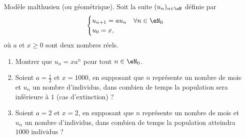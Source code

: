 


\begin{exercice}\label{exoTD3-0002}

	Modèle malthusien (ou géométrique). Soit la suite $(u_n)_{n\in\eN}$ définie par
	\begin{equation}
		\begin{cases}
			u_{n+1}=au_n	&	\forall n\in\eN_0\\
			u_0=x,
		\end{cases}
	\end{equation}
	où $a$ et $x\geq 0$ sont deux nombres réels.

	\begin{enumerate}
		\item
			Montrer que $u_n=xa^n$ pour tout $n\in\eN_0$.
		\item
			Soient $a=\frac{ 1 }{2}$ et $x=1000$, en supposant que $n$ représente un nombre de mois et $u_n$ un nombre d'individus, dans combien de temps la population sera inférieure à $1$ (cas d'extinction) ?
		\item
			Soient $a=2$ et $x=2$, en supposant que $n$ représente un nombre de mois et $u_n$ un nombre d'individus, dans combien de temps la population atteindra $1000$ individus ?

	\end{enumerate}

\end{exercice}
